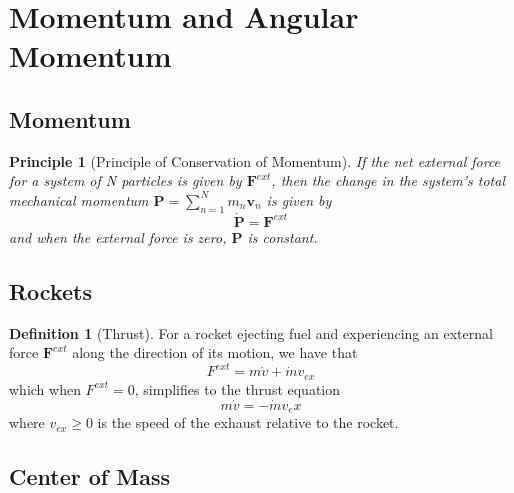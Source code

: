 \documentclass[12pt]{article}
\newtheorem{pri}[thm]{Principle}
\theoremstyle{definition}
\newtheorem{defn}[thm]{Definition}
\theoremstyle{remark}
\numberwithin{equation}{section}
\newcommand\B[1]{\textbf{#1}}
\begin{document}
\clearpage
\section{Momentum and Angular Momentum}


\subsection{Momentum}


\begin{pri}[Principle of Conservation of Momentum]
        If the net external force for a system of N particles is given by $\B{F}^{ext}$, then the change in the system's total mechanical momentum $\B{P} = \sum_{n=1}^Nm_n\B{v}_n$ is given by \begin{equation}
                \dot{\B{P}} = \B{F}^{ext}
        \end{equation}
        and when the external force is zero, $\B{P}$ is constant.
\end{pri}

\vspace{15pt}



\subsection{Rockets}



\begin{defn}[Thrust]
        For a rocket ejecting fuel and experiencing an external force $\B{F}^{ext}$ along the direction of its motion, we have that \begin{equation}
                F^{ext} = m\dot{v}+\dot{m}v_{ex}
        \end{equation}
        which when $F^{ext} = 0$, simplifies to the thrust equation \begin{equation}
                m\dot{v} = -\dot{m}v_ex
        \end{equation}
        where $v_{ex} \geq 0$ is the speed of the exhaust relative to the rocket.
\end{defn}


\vspace{15pt}

\subsection{Center of Mass}
\end{document}
